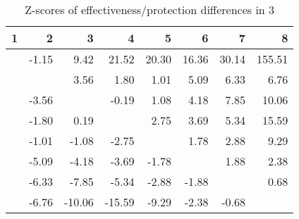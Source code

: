 \begin{table}[ht]
\centering
\begin{tabular}{rrrrrrrr}
  \hline
1 & 2 & 3 & 4 & 5 & 6 & 7 & 8 \\ 
  \hline
 & -1.15 & 9.42 & 21.52 & 20.30 & 16.36 & 30.14 & 155.51 \\ 
   &  & 3.56 & 1.80 & 1.01 & 5.09 & 6.33 & 6.76 \\ 
   & -3.56 &  & -0.19 & 1.08 & 4.18 & 7.85 & 10.06 \\ 
   & -1.80 & 0.19 &  & 2.75 & 3.69 & 5.34 & 15.59 \\ 
   & -1.01 & -1.08 & -2.75 &  & 1.78 & 2.88 & 9.29 \\ 
   & -5.09 & -4.18 & -3.69 & -1.78 &  & 1.88 & 2.38 \\ 
   & -6.33 & -7.85 & -5.34 & -2.88 & -1.88 &  & 0.68 \\ 
   & -6.76 & -10.06 & -15.59 & -9.29 & -2.38 & -0.68 &  \\ 
   \hline
\end{tabular}
\caption{Z-scores of effectiveness/protection differences in  3} 
\end{table}
